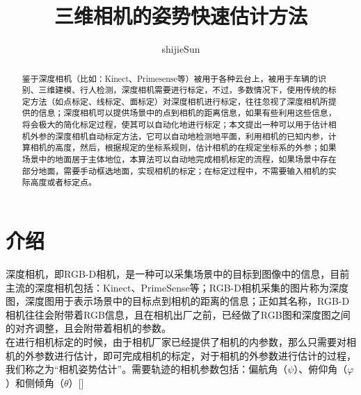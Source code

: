 \documentclass[10pt,a4paper]{paper}
\author{shijieSun}
\title{三维相机的姿势快速估计方法}
\begin{document}

	\maketitle
	\begin{abstract}
		鉴于深度相机（比如：Kinect、Primesense等）被用于各种云台上，被用于车辆的识别、三维建模、行人检测，深度相机需要进行标定，不过，多数情况下，使用传统的标定方法（如点标定、线标定、面标定）对深度相机进行标定，往往忽视了深度相机所提供的信息；深度相机可以提供场景中的点到相机的距离信息，如果有些利用这些信息，将会极大的简化标定过程，使其可以自动化地进行标定；本文提出一种可以用于估计相机外参的深度相机自动标定方法，它可以自动地检测地平面，利用相机的已知内参，计算相机的高度，然后，根据规定的坐标系规则，估计相机的在规定坐标系的外参；如果场景中的地面居于主体地位，本算法可以自动地完成相机标定的流程，如果场景中存在部分地面，需要手动框选地面，实现相机的标定；在标定过程中，不需要输入相机的实际高度或者标定点。
	\end{abstract}
	
	\section{介绍}
	深度相机，即RGB-D相机，是一种可以采集场景中的目标到图像中的信息，目前主流的深度相机包括：Kinect、PrimeSense等；RGB-D相机采集的图片称为深度图，深度图用于表示场景中的目标点到相机的距离的信息；正如其名称，RGB-D相机往往会附带着RGB信息，且在相机出厂之前，已经做了RGB图和深度图之间的对齐调整，且会附带着相机的参数。\\
	
	在进行相机标定的时候，由于相机厂家已经提供了相机的内参数，那么只需要对相机的外参数进行估计，即可完成相机的标定，对于相机的外参数进行估计的过程，我们称之为“相机姿势估计”。需要轨迹的相机参数包括：偏航角（$\psi$）、俯仰角（$\varphi $）和侧倾角（$\theta $）[]\\
	
\end{document}
